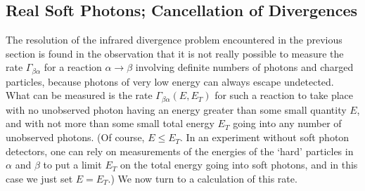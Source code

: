 
\subsection{Real Soft Photons; Cancellation of Divergences}

The resolution of the infrared divergence problem encountered in the
previous section is found in the observation that it is not really possible
to measure the rate $\Gamma_{\beta\alpha}$ for a reaction $\alpha\to\beta$
involving definite numbers of photons and charged particles, because photons
of very low energy can always escape undetected. What can be measured is the
rate $\Gamma_{\beta\alpha}(E,E_T)$ for such a reaction to take place with no
unobserved photon having an energy greater than some small quantity $E$, and
with not more than some small total energy $E_T$ going into any number of
unobserved photons. (Of course, $E\leq E_T$. In an experiment without soft
photon detectors, one can rely on measurements of the energies of the `hard'
particles in $\alpha$ and $\beta$ to put a limit $E_T$ on the total energy
going into soft photons, and in this case we just set $E=E_T$.) We now turn to
a calculation of this rate.

